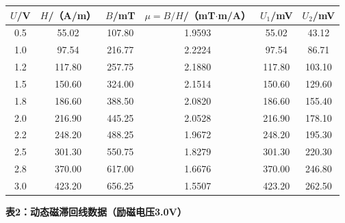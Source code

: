 \documentclass[a4paper,12pt]{article}
\begin{document}
\vspace{0.3cm}

\begin{table}[h]
\centering
\fontsize{10pt}{14pt}\selectfont
\begin{tabular}{c c c c c c}
\toprule
$U$/V & $H$/（A/m） & $B$/mT & $\mu = B/H$/（mT$\cdot$m/A） & $U_1$/mV & $U_2$/mV \\
\midrule
0.5  & 55.02  & 107.80 & 1.9593 & 55.02  & 43.12 \\
1.0  & 97.54  & 216.77 & 2.2224 & 97.54  & 86.71 \\
1.2  & 117.80 & 257.75 & 2.1880 & 117.80 & 103.10 \\
1.5  & 150.60 & 324.00 & 2.1514 & 150.60 & 129.60 \\
1.8  & 186.60 & 388.50 & 2.0820 & 186.60 & 155.40 \\
2.0  & 216.90 & 445.25 & 2.0528 & 216.90 & 178.10 \\
2.2  & 248.20 & 488.25 & 1.9672 & 248.20 & 195.30 \\
2.5  & 301.30 & 550.75 & 1.8279 & 301.30 & 220.30 \\
2.8  & 370.00 & 617.00 & 1.6676 & 370.00 & 246.80 \\
3.0  & 423.20 & 656.25 & 1.5507 & 423.20 & 262.50 \\
\bottomrule
\end{tabular}
\end{table}

\vspace{0.5cm}

{\fontsize{12pt}{18pt}\selectfont \textbf{表2：动态磁滞回线数据（励磁电压3.0V）}}

\vspace{0.3cm}
\end{document}
